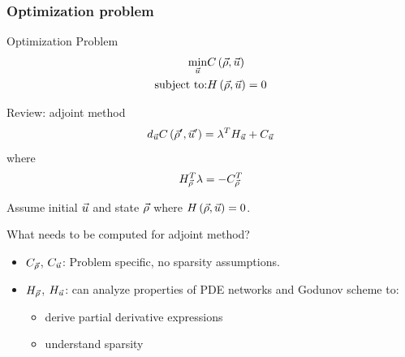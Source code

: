 \begin{frame}[t]\frametitle{Optimization problem}
    

\begin{block}{Optimization Problem}
\begin{eqnarray}
\underset{\vec{u}}{\min} & C\left(\vec{\rho},\vec{u}\right)\nonumber \\
\text{subject to:} & H\left(\vec{\rho},\vec{u}\right)=0\label{eq:op-problem}
\end{eqnarray}
\end{block}

\begin{block}{Review: adjoint method}
\begin{equation}
d_{\vec{u}}C\left(\vec{\rho}',\vec{u}'\right)=\lambda^{T}H_{\vec{u}}+C_{\vec{u}}\label{eq:adjoint-grad}
\end{equation}
where
\begin{equation}
H_{\vec{\rho}}^{T}\lambda=-C_{\vec{\rho}}^{T}\label{eq:adjoint}
\end{equation}


\end{block}


\end{frame}

\begin{frame}


Assume initial $\vec{u}$ and state $\vec{\rho}$ where $H\left(\vec{\rho}, \vec{u}\right) = 0$.
\begin{block}{What needs to be computed for adjoint method?}
\begin{itemize}
    \item $C_{\vec{\rho}}$, $C_{\vec{u}}$: Problem specific, no sparsity assumptions.
    \item $H_{\vec{\rho}}$, $H_{\vec{u}}$: can analyze properties of PDE networks and Godunov scheme to:
    \begin{itemize}
        \item derive partial derivative expressions
        \item understand sparsity
    \end{itemize}
\end{itemize}
\end{block}

\end{frame}

